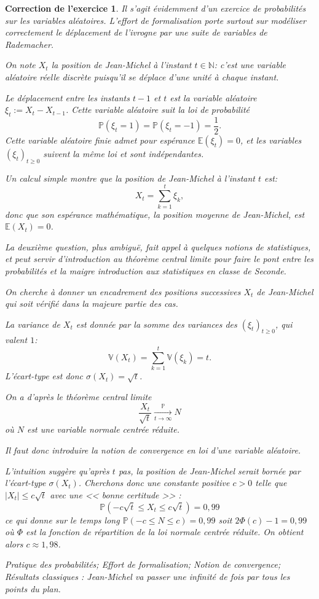 \documentclass[12pt]{article}
\theoremstyle{break}
\newtheorem{cor}{Correction de l'exercice}
\newcommand{\NN}{\mathbb N}
\newcommand{\PP}{\mathbb P}
\newcommand{\EE}{\mathbb E}
\newcommand{\VV}{\mathbb V}
\begin{document}
\begin{cor}
\textit{Il s'agit évidemment d'un exercice de probabilités sur les variables aléatoires. L'effort de formalisation porte surtout sur modéliser correctement le déplacement de l'ivrogne par une suite de variables de Rademacher.}

On note $X_t$ la position de Jean-Michel à l'instant $t\in\NN$: c'est une variable aléatoire réelle discrète puisqu'il se déplace d'une unité à chaque instant.

Le déplacement entre les instants $t-1$ et $t$ est la variable aléatoire $\xi_t := X_t-X_{t-1}$. Cette variable aléatoire suit la loi de probabilité
\[
\PP(\xi_t = 1) = \PP(\xi_t = -1) = \frac{1}{2}. 
\]
Cette variable aléatoire finie admet pour espérance $\EE(\xi_t) = 0$, et les variables $(\xi_t)_{t\geq 0}$ suivent la même loi et sont indépendantes.

Un calcul simple montre que la position de Jean-Michel à l'instant $t$ est:
\[
X_t = \sum_{k=1}^t \xi_k,
\]
donc que son espérance mathématique, la position moyenne de Jean-Michel, est $\EE(X_t) = 0$.

\textit{La deuxième question, plus ambiguë, fait appel à quelques notions de statistiques, et peut servir d'introduction au théorème central limite pour faire le pont entre les probabilités et la maigre introduction aux statistiques en classe de Seconde.}

On cherche à donner un encadrement des positions successives $X_t$ de Jean-Michel qui soit vérifié dans la majeure partie des cas.

La variance de $X_t$ est donnée par la somme des variances des $(\xi_t)_{t\geq 0}$, qui valent $1$:
\[
\VV(X_t) = \sum_{k=1}^t \VV(\xi_k) = t.
\]
L'écart-type est donc $\sigma(X_t) = \sqrt{t}$.

On a d'après le théorème central limite
\[
\frac{X_t}{\sqrt{t}} \xrightarrow[t\to\infty]{\PP} N
\]
où $N$ est une variable normale centrée réduite.

\textit{Il faut donc introduire la notion de convergence en loi d'une variable aléatoire.}

L'intuition suggère qu'après $t$ pas, la position de Jean-Michel serait bornée par l'écart-type $\sigma(X_t)$. Cherchons donc une constante positive $c > 0$ telle que $|X_t| \leq c\sqrt{t}$ avec une << bonne certitude >> :
\[
\PP\left(-c\sqrt t \leq X_t \leq c\sqrt t\right) = 0,\!99
\]
ce qui donne sur le temps long $\PP(-c \leq N \leq c) = 0,\!99$ soit $2\Phi(c) - 1 = 0,\!99$ où $\Phi$ est la fonction de répartition de la loi normale centrée réduite. On obtient alors $c\approx 1,\!98$.\newline 

\textit{Pratique des probabilités; Effort de formalisation; Notion de convergence; Résultats classiques : Jean-Michel va passer une infinité de fois par tous les points du plan.}

\end{cor}
\end{document}
